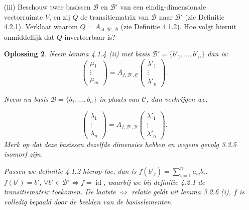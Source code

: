 \documentclass[a4paper,12pt]{article}
\newtheorem{oplossing}{Oplossing}
\begin{document}
\begin{enumerate}
\begin{oplossing}
       Stel dat de $f(b)$'s niet twee aan twee  verschillend zijn, en \(f(b_1) = f(b_2)\), dan geldt \(\lambda_{b_1}b_1 + \lambda_{b_2} b_2 = 0\) voor \(\lambda_{b_1} = - \lambda_{b_2}\) waarbij ze niet persee \(0\) hoeeven te zijn!
       Hieruit volgt dat het twee aan twee verschillend zijn een noodzakelijke voorwaarde is.
       \qed
    \end{oplossing}
    \item[(iii)] Beschouw twee basissen $\mathcal{B}$ en $\mathcal{B}'$ van een eindig-dimensionale vectorruimte $V$, en zij $Q$ de transitiematrix van $\mathcal{B}$ naar $\mathcal{B}'$ (zie Definitie 4.2.1). Verklaar waarom $Q = A_{\text{id},\mathcal{B}',\mathcal{B}}$ (zie Definitie 4.1.2). Hoe volgt hieruit onmiddellijk dat $Q$ inverteerbaar is?
    \begin{oplossing}
        Neem lemma 4.1.4 (ii) met basis \(\mathcal{B}' = \{b'_1,\dots,b'_n\}\) dan is:
        \[
        \begin{pmatrix}
            \mu_1 \\ \vdots \\ \mu_m
        \end{pmatrix}
        =
        A_{f,\mathcal{B}',\mathcal{C}}
        \begin{pmatrix}
            \lambda'_1 \\ \vdots \\ \lambda'_n
        \end{pmatrix}.
        \]

        Neem nu basis \(\mathcal{B} = \{b_1,\dots, b_n\} \) in plaats van \(\mathcal{C}\), dan verkrijgen we:

        \[
        \begin{pmatrix}
            \lambda_1 \\ \vdots \\ \lambda_n
        \end{pmatrix}
        =
        A_{f,\mathcal{B}',\mathcal{B}}
        \begin{pmatrix}
            \lambda'_1 \\ \vdots \\ \lambda'_n
        \end{pmatrix}.
        \]
        Merk op dat deze basissen dezelfde dimensies hebben en wegens gevolg 3.3.5 isomorf zijn.

        Passen we definitie 4.1.2 hierop toe, dan is \(f(b'_j) = \sum_{i=1}^{n} a_{ij}b_i\).
        \(f(b') = b', \,\forall b' \in \mathcal{B}' \iff f = \operatorname{id} \), waarbij we bij definitie 4.2.1 de transitiematrix toekomen.
        De laatste \(\iff\) relatie geldt uit lemma 3.2.6 (i), \(f\) is volledig bepaald door de beelden van de basiselementen.


\end{oplossing}
\end{enumerate}
\end{document}
